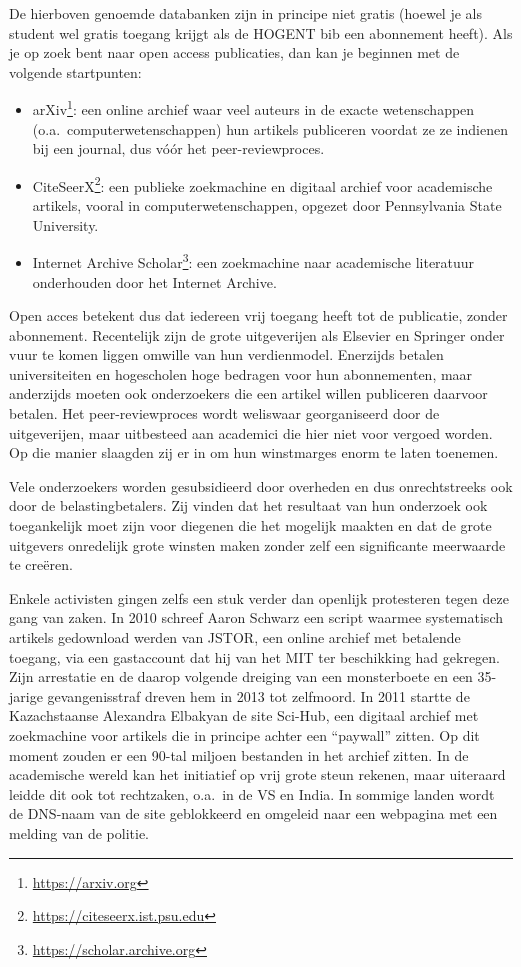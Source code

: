 De hierboven genoemde databanken zijn in principe niet gratis (hoewel je als student wel gratis toegang krijgt als de HOGENT bib een abonnement heeft). Als je op zoek bent naar open access publicaties, dan kan je beginnen met de volgende startpunten:

\begin{itemize}
  \item arXiv\footnote{\url{https://arxiv.org}}: een online archief waar veel auteurs in de exacte wetenschappen (o.a.\ computerwetenschappen) hun artikels publiceren voordat ze ze indienen bij een journal, dus vóór het peer-reviewproces.
  \item CiteSeerX\footnote{\url{https://citeseerx.ist.psu.edu}}: een publieke zoekmachine en digitaal archief voor academische artikels, vooral in computerwetenschappen, opgezet door Pennsylvania State University.
  \item Internet Archive Scholar\footnote{\url{https://scholar.archive.org}}: een zoekmachine naar academische literatuur onderhouden door het Internet Archive.
\end{itemize}

Open acces betekent dus dat iedereen vrij toegang heeft tot de publicatie, zonder abonnement. Recentelijk zijn de grote uitgeverijen als Elsevier en Springer onder vuur te komen liggen omwille van hun verdienmodel. Enerzijds betalen universiteiten en hogescholen hoge bedragen voor hun abonnementen, maar anderzijds moeten ook onderzoekers die een artikel willen publiceren daarvoor betalen. Het peer-reviewproces wordt weliswaar georganiseerd door de uitgeverijen, maar uitbesteed aan academici die hier niet voor vergoed worden. Op die manier slaagden zij er in om hun winstmarges enorm te laten toenemen.

Vele onderzoekers worden gesubsidieerd door overheden en dus onrechtstreeks ook door de belastingbetalers. Zij vinden dat het resultaat van hun onderzoek ook toegankelijk moet zijn voor diegenen die het mogelijk maakten en dat de grote uitgevers onredelijk grote winsten maken zonder zelf een significante meerwaarde te creëren.

Enkele activisten gingen zelfs een stuk verder dan openlijk protesteren tegen deze gang van zaken. In 2010 schreef Aaron Schwarz een script waarmee systematisch artikels gedownload werden van JSTOR, een online archief met betalende toegang, via een gastaccount dat hij van het MIT ter beschikking had gekregen. Zijn arrestatie en de daarop volgende dreiging van een monsterboete en een 35-jarige gevangenisstraf dreven hem in 2013 tot zelfmoord. In 2011 startte de Kazachstaanse Alexandra Elbakyan de site Sci-Hub, een digitaal archief met zoekmachine voor artikels die in principe achter een ``paywall'' zitten. Op dit moment zouden er een 90-tal miljoen bestanden in het archief zitten. In de academische wereld kan het initiatief op vrij grote steun rekenen, maar uiteraard leidde dit ook tot rechtzaken, o.a.\ in de VS en India. In sommige landen wordt de DNS-naam van de site geblokkeerd en omgeleid naar een webpagina met een melding van de politie.


